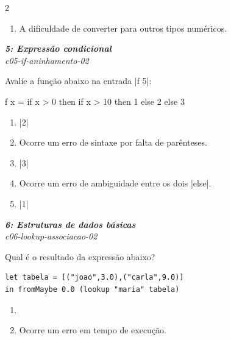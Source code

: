 \documentclass[a4paper,10pt,brazil]{article}
\begin{document}
\begin{multicols}{2}
\begin{enumerate}
  \item A dificuldade de converter para outros tipos numéricos.


\end{enumerate}

\begin{flushright}
  \footnotesize
  \textit{\textbf{5: Expressão condicional}}\\
  \textit{c05-if-aninhamento-02}\\

\end{flushright}
Avalie a função abaixo na entrada \haskellinline|f 5|:
\begin{haskellcode}
f x = if x > 0
      then if x > 10
           then 1
           else 2
      else 3
\end{haskellcode}

\begin{enumerate}
  \item \haskellinline|2|

  \item Ocorre um erro de sintaxe por falta de parênteses.

  \item \haskellinline|3|

  \item Ocorre um erro de ambiguidade entre os dois \haskellinline|else|.

  \item \haskellinline|1|


\end{enumerate}

\begin{flushright}
  \footnotesize
  \textit{\textbf{6: Estruturas de dados básicas}}\\
  \textit{c06-lookup-associacao-02}\\

\end{flushright}
Qual é o resultado da expressão abaixo?
\begin{verbatim}
let tabela = [("joao",3.0),("carla",9.0)]
in fromMaybe 0.0 (lookup "maria" tabela)
\end{verbatim}

\begin{enumerate}
  \item {}

  \item Ocorre um erro em tempo de execução.


\end{enumerate}
\end{multicols}
\end{document}
